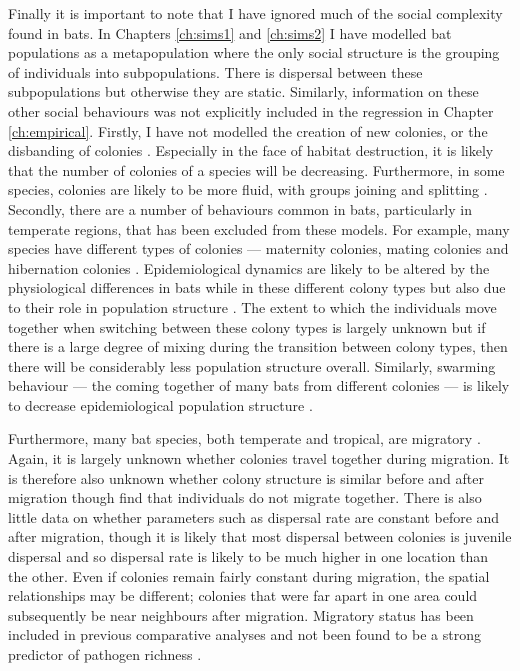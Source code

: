Finally it is important to note that I have ignored much of the social complexity found in bats.
In Chapters \ref{ch:sims1} and \ref{ch:sims2} I have modelled bat populations as a metapopulation where the only social structure is the grouping of individuals into subpopulations.
There is dispersal between these subpopulations but otherwise they are static.
Similarly, information on these other social behaviours was not explicitly included in the regression in Chapter \ref{ch:empirical}.
Firstly, I have not modelled the creation of new colonies, or the disbanding of colonies \cite{metheny2008genetic}.
Especially in the face of habitat destruction, it is likely that the number of colonies of a species will be decreasing.
Furthermore, in some species, colonies are likely to be more fluid, with groups joining and splitting \cite{kerth2012causes, august2014sympatric}.
Secondly, there are a number of behaviours common in bats, particularly in temperate regions, that has been excluded from these models.
For example, many species have different types of colonies --- maternity colonies, mating colonies and hibernation colonies \cite{kerth2008causes}.
Epidemiological dynamics are likely to be altered by the physiological differences in bats while in these different colony types  but also due to their role in population structure \cite{george2011host, langwig2015host, blehert2012fungal, webber2016social}.
The extent to which the individuals move together when switching between these colony types is largely unknown \cite{kurta2002philopatry, baerwald2016migratory} but if there is a large degree of mixing during the transition between colony types, then there will be considerably less population structure overall.
Similarly, swarming behaviour --- the coming together of many bats from different colonies --- is likely to decrease epidemiological population structure \cite{kerth2012causes}.


Furthermore, many bat species, both temperate and tropical, are migratory \cite{fleming2003ecology, krauel2013recent, popa2009bats, hutterer2005bat}.
Again, it is largely unknown whether colonies travel together during migration. 
It is therefore also unknown whether colony structure is similar before and after migration \cite{carter2013cooperation} though \textcite{kurta2002philopatry} find that individuals do not migrate together.
There is also little data on whether parameters such as dispersal rate are constant before and after migration, though it is likely that most dispersal between colonies is juvenile dispersal and so dispersal rate is likely to be much higher in one location than the other.
Even if colonies remain fairly constant during migration, the spatial relationships may be different; colonies that were far apart in one area could subsequently be near neighbours after migration.
Migratory status has been included in previous comparative analyses and not been found to be a strong predictor of pathogen richness \cite{turmelle2009correlates, maganga2014bat}. 

